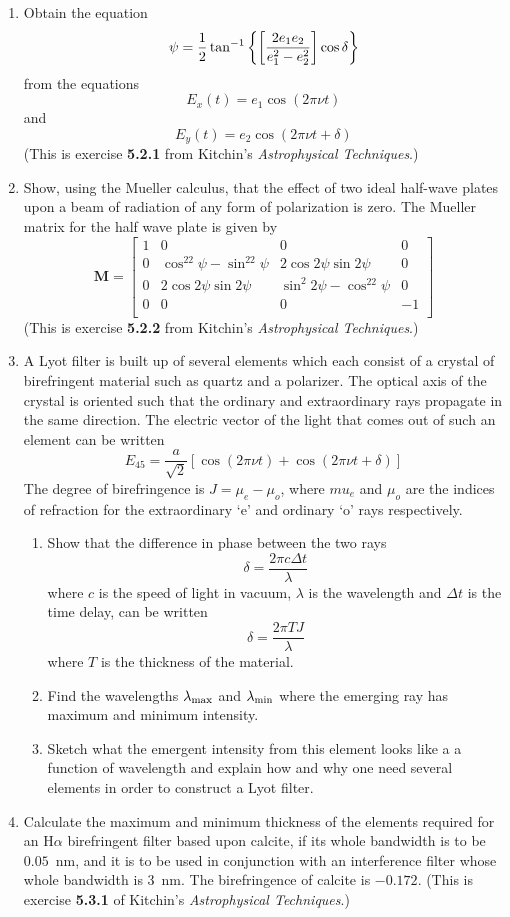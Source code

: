 \documentclass{article}
\newcommand{\be}{\begin{equation}}
\newcommand{\ee}{\end{equation}}
\begin{document}
\begin{enumerate}
\item Obtain the equation 
\[ \psi={1\over 2}\tan^{-1}\left\{\left[{2e_1e_2\over e_1^2-e_2^2}\right]\cos\delta\right\} \]
from the equations
\[ E_x(t)=e_1\cos(2\pi\nu t) \]
and
\[ E_y(t)=e_2\cos(2\pi\nu t+\delta) \]
(This is exercise {\bf 5.2.1} from Kitchin's {\it Astrophysical Techniques}.)
\item Show, using the Mueller calculus, that the effect of two ideal half-wave 
plates upon a beam of radiation of any form of polarization is
zero. The Mueller matrix for the half wave plate is given by 
\[
\mathbf{M}=\left[\begin{array}{cccc}
1 & 0 & 0 & 0 \\
0 & \cos^22\psi-\sin^22\psi & 2\cos 2\psi\sin 2\psi & 0 \\
0 & 2\cos 2\psi\sin 2\psi & \sin^2 2\psi-\cos^22\psi & 0 \\
0 & 0 & 0 & -1 \\ \end{array}\right]
\]
(This is exercise {\bf 5.2.2} from Kitchin's {\it Astrophysical
  Techniques}.)
\item A Lyot filter is built up of several elements which each consist
  of a crystal of birefringent material such as quartz and a
  polarizer. The optical axis of the crystal is oriented such that the
  ordinary and extraordinary rays propagate in the same direction. The
  electric vector of the light that comes out of such an element can
  be written
\be
E_{45}=\frac{a}{\sqrt{2}}[\cos(2\pi\nu t)+\cos(2\pi\nu t+\delta)]
\ee
The degree of birefringence is $J=\mu_e-\mu_o$, where $mu_e$ and
$\mu_o$ are the indices of refraction for the extraordinary `e' and
ordinary `o' rays respectively.
\begin{enumerate}
\item Show that the difference in phase between the two rays 
\be
\delta=\frac{2\pi c\Delta t}{\lambda}
\ee
where $c$ is the speed of light in vacuum, $\lambda$ is the wavelength
and $\Delta t$ is the time delay, can be written
\be
\delta=\frac{2\pi TJ}{\lambda}
\ee
where $T$ is the thickness of the material. 
\item Find the wavelengths $\lambda_{\rm max}$ and $\lambda_{\rm min}$ where
the emerging ray has maximum and minimum intensity.
\item Sketch what the emergent intensity from this element looks like
  a a function of wavelength and explain how and why one need several
  elements in order to construct a Lyot filter.
\end{enumerate}
\item Calculate the maximum and minimum thickness of the elements required
for an H$\alpha$ birefringent filter based upon calcite, if its whole 
bandwidth is to be $0.05$~nm, and it is to be used in conjunction with an
interference filter whose whole bandwidth is 3~nm. The birefringence of 
calcite is $-0.172$.
(This is exercise {\bf 5.3.1} of Kitchin's {\it Astrophysical Techniques}.) 
\end{enumerate}
\end{document}
